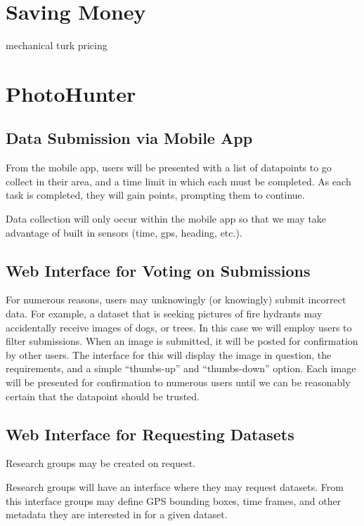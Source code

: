 \documentclass{article}
\begin{document}
\section{Saving Money}

mechanical turk pricing

\section{PhotoHunter}

\subsection{Data Submission via Mobile App}

From the mobile app, users will be presented with a list of datapoints
to go collect in their area, and a time limit in which each must be
completed. As each task is completed, they will gain points, prompting
them to continue.

Data collection will only occur within the mobile app so that we may
take advantage of built in sensors (time, gps, heading, etc.).

\subsection{Web Interface for Voting on Submissions}

For numerous reasons, users may unknowingly (or knowingly) submit
incorrect data. For example, a dataset that is seeking pictures of
fire hydrants may accidentally receive images of dogs, or trees. In
this case we will employ users to filter submissions. When an image is
submitted, it will be posted for confirmation by other users. The
interface for this will display the image in question, the
requirements, and a simple ``thumbs-up'' and ``thumbs-down'' option.
Each image will be presented for confirmation to numerous users until
we can be reasonably certain that the datapoint should be trusted.

\subsection{Web Interface for Requesting Datasets}

Research groups may be created on request. 

Research groups will have an interface where they may request
datasets. From this interface groups may define GPS bounding boxes,
time frames, and other metadata they are interested in for a given
dataset.
\end{document}

